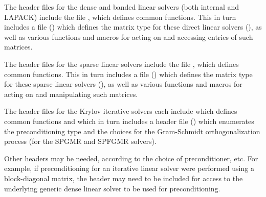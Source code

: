 \documentclass[letterpaper,10pt,english]{sphinxmanual}
\begin{document}
The header files for the dense and banded linear solvers (both
internal and LAPACK) include the file , which defines
common functions.  This in turn includes a file ()
which defines the matrix type for these direct linear solvers
(), as well as various functions and macros for acting on and
accessing entries of such matrices.

The header files for the sparse linear solvers include the file
, which defines common functions.  This in turn
includes a file () which defines the matrix type
for these sparse linear solvers (), as well as various
functions and macros for acting on and manipulating such matrices.

The header files for the Krylov iterative solvers each include
 which defines common functions and which in turn
includes a header file () which enumerates the
preconditioning type and the choices for the Gram-Schmidt
orthogonalization process (for the SPGMR and SPFGMR solvers).

Other headers may be needed, according to the choice of
preconditioner, etc.  For example, if preconditioning for an iterative
linear solver were performed using a block-diagonal
matrix, the header  may need to be included for
access to the underlying generic dense linear solver to be used for
preconditioning.
\end{document}
